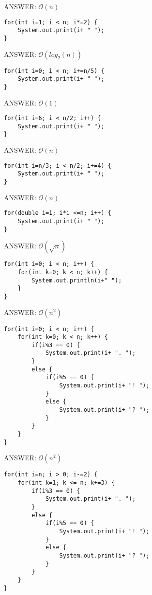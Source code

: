\begin{questions}
\ifprintanswers
ANSWER: $\mathcal{O}(n)$
\else
\fi


\begin{lstlisting}
for(int i=1; i < n; i*=2) {
	System.out.print(i+ " ");
}
\end{lstlisting}

\ifprintanswers
ANSWER: $\mathcal{O}(log_2(n))$
\else
\fi

\begin{lstlisting}
for(int i=0; i < n; i+=n/5) {
	System.out.print(i+ " ");
}
\end{lstlisting}

\ifprintanswers
ANSWER: $\mathcal{O}(1)$
\else
\fi

\begin{lstlisting}
for(int i=6; i < n/2; i++) {
	System.out.print(i+ " ");
}
\end{lstlisting}

\ifprintanswers
ANSWER: $\mathcal{O}(n)$
\else
\fi


\begin{lstlisting}
for(int i=n/3; i < n/2; i+=4) {
	System.out.print(i+ " ");
}
\end{lstlisting}

\ifprintanswers
ANSWER: $\mathcal{O}(n)$
\else
\fi


\begin{lstlisting}
for(double i=1; i*i <=n; i++) {
	System.out.print(i+ " ");
}
\end{lstlisting}

\ifprintanswers
ANSWER: $\mathcal{O}(\sqrt{n})$
\else
\fi


\begin{lstlisting}
for(int i=0; i < n; i++) {
	for(int k=0; k < n; k++) {
		System.out.println(i+" ");
	}
}
\end{lstlisting}

\ifprintanswers
ANSWER: $\mathcal{O}(n^2)$
\else
\fi

\begin{lstlisting}
for(int i=0; i < n; i++) {
	for(int k=0; k < n; k++) {
		if(i%3 == 0) {
			System.out.print(i+ ". ");
		}
		else {
			if(i%5 == 0) {
				System.out.print(i+ "! ");
			}
			else {
				System.out.print(i+ "? ");
			}
		}
	}
}
\end{lstlisting}

\ifprintanswers
ANSWER: $\mathcal{O}(n^2)$
\else
\fi

\begin{lstlisting}
for(int i=n; i > 0; i-=2) {
	for(int k=1; k <= n; k+=3) {
		if(i%3 == 0) {
			System.out.print(i+ ". ");
		}
		else {
			if(i%5 == 0) {
				System.out.print(i+ "! ");
			}
			else {
				System.out.print(i+ "? ");
			}
		}
	}
}
\end{lstlisting}


\end{questions}
